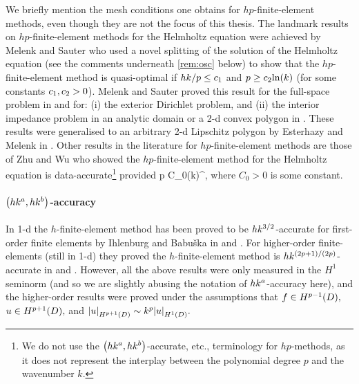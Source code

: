 We briefly mention the mesh conditions one obtains for $hp$-finite-element methods, even though they are not the focus of this thesis. The landmark results on $hp$-finite-element methods for the Helmholtz equation were achieved by Melenk and Sauter \cite{MeSa:10,MeSa:11} who used a novel splitting of the solution of the Helmholtz equation (see the comments underneath \cref{rem:osc} below) to show that the $hp$-finite-element method is quasi-optimal if $hk/p \leq c_{1}$ and $p \geq \ct \ln k$ (for some constants $c_{1},c_{2}>0$). Melenk and Sauter proved this result for the full-space problem in \cite{MeSa:10} and for: (i) the exterior Dirichlet problem, and (ii) the interior impedance problem in an analytic domain or a 2-d convex polygon in \cite{MeSa:11}. These results were generalised to an arbitrary 2-d Lipschitz polygon by Esterhazy and Melenk in \cite[Theorem 4.2]{EsMe:12}. Other results in the literature for $hp$-finite-element methods are those of Zhu and Wu \cite[Equation (1.7)]{ZhWu:13} who showed the $hp$-finite-element method for the Helmholtz equation is data-accurate\footnote{We do not use the $\hk{a}b$-accurate, etc., terminology for $hp$-methods, as it does not represent the interplay between the polynomial degree $p$ and the wavenumber $k$.} provided
\beqs
{}p \leq C_0\mleft(k\mright)^{},
\eeqs
where $C_0>0$ is some constant.%
\ere


\paragraph{$\hk{a}b$-accuracy} In 1-d the $h$-finite-element method has been proved to be $hk^{3/2}$-accurate for first-order finite elements by Ihlenburg and Babu\v{s}ka in \cite[Theorem 5 and Equation (3.25)]{IhBa:95a} and \cite[Equation (4.5.15)]{Ih:98}. For higher-order finite-elements (still in 1-d) they proved the $h$-finite-element method is $hk^{(2p+1)/(2p)}$-accurate in \cite[Corollary 3.2]{IhBa:97} and \cite[Theorem 4.27 and Equation 4.7.41]{Ih:98}. However, all the above results were only measured in the $H^1$ seminorm (and so we are slightly abusing the notation of $hk^{a}$-accuracy here), and the higher-order results were proved under the assumptions that $f \in \HpmoD,$ $u \in \HppoD,$ and $\SNHppoD{u} \sim k^p \SNHoD{u}.$

